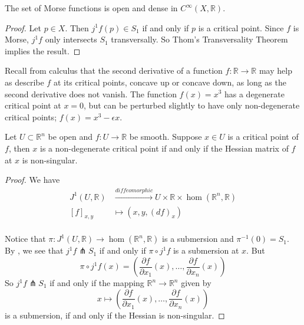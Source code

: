 \documentclass[12pt]{article}
\newcommand{\RR}{\mathbb{R}}
\begin{document}
\begin{theorem}
    The set of Morse functions is open and dense in $C^\infty(X, \RR)$. 
\end{theorem}

\begin{proof}
    Let $p \in X$. Then $j^1 f (p) \in S_1$ if and only if $p$ is a critical point. Since $f$ is Morse, $j^1 f $ only intersects $S_1$ transversally. So Thom's Transversality Theorem implies the result. 
\end{proof}


\begin{example}
    Recall from calculus that the second derivative of a function $f: \RR \to \RR$ may help as describe $f$ at its critical points, concave up or concave down, as long as the second derivative does not vanish. The function $f(x) = x^3$ has a degenerate critical point at $x=0$, but can be perturbed slightly to have only non-degenerate critical points; $f(x) = x^3 - \epsilon x$. 
\end{example}




\begin{proposition}
    Let $U \subset \RR^n$ be open and $f: U \to \RR$ be smooth. Suppose $x\in U$ is a critical point of $f$, then $x$ is a non-degenerate critical point if and only if the Hessian matrix of $f$ at $x$ is non-singular. 
\end{proposition}

\begin{proof}
    We have 
    \begin{align*}
        J^1(U, \RR) & \xrightarrow{diffeomorphic} U \times \RR \times \hom (\RR^n, \RR) \\ 
        [f]_{x, y} & \mapsto (x, y, (df)_x) \\ 
    \end{align*}
    
    Notice that $\pi: J^1(U, \RR) \to \hom(\RR^n, \RR)$ is a submersion and $\pi^{-1}(0) = S_1$. By , we see that $j^1 f \pitchfork S_1$ if and only if $\pi \circ j^1 f$ is a submersion at $x$. But 
    $$\pi \circ j^1 f (x) = \left( \frac{\partial f}{\partial x_1} (x), \dots, \frac{\partial f}{\partial x_n} (x)\right)$$
    So $j^1 f \pitchfork S_1$ if and only if the mapping $\RR^n \to \RR^n$ given by 
    $$
    x\mapsto \left( \frac{\partial f}{\partial x_1} (x), \dots, \frac{\partial f}{\partial x_n} (x)\right)
    $$
    is a submersion, if and only if the Hessian is non-singular. 
\end{proof}
\end{document}
